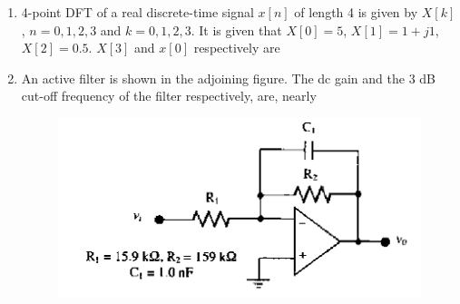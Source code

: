\documentclass[journal,12pt,onecolumn]{IEEEtran}
\theoremstyle{remark}
\begin{document}
\begin{enumerate}
\newpage

\item 4-point DFT of a real discrete-time signal $x[n]$ of length 4 is given by $X[k]$, $n=0,1,2,3$ and $k=0,1,2,3$. It is given that $X[0]=5$, $X[1]=1+j1$, $X[2]=0.5$. $X[3]$ and $x[0]$ respectively are
\hfill{}\begin{enumerate}  
\end{enumerate}

\vspace{0.5cm}

\item An active filter is shown in the adjoining figure. The dc gain and the 3 dB cut-off frequency of the filter respectively, are, nearly
\begin{figure}[h]
    \centering
    \includegraphics[scale=0.75]{q47}
    \caption*{}
    \label{fig:placeholder}
\end{figure}

\hfill{}
\begin{enumerate} 
\end{enumerate}



\end{enumerate}
\end{document}
